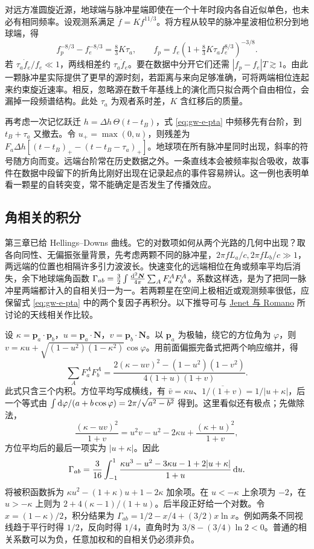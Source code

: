 对远方准圆旋近源，地球端与脉冲星端即使在一个十年时段内各自近似单色，也未必有相同频率。设观测系满足 $\dot f=K f^{11/3}$。将方程从较早的脉冲星波相位积分到地球端，得
\[
 f_p^{-8/3}-f_e^{-8/3}=\tfrac83K\tau_a,\qquad
 f_p=f_e\left(1+\tfrac83 K\tau_a f_e^{8/3}\right)^{-3/8}.
\]
若 $\tau_a\dot f_e/f_e\ll1$，两线相差约 $\tau_a\dot f_e$。要在数据中分开它们还需 $|f_p-f_e|T\gtrsim1$。由此一颗脉冲星实际提供了更早的源时刻，若距离与来向足够准确，可将两端相位连起来约束旋近速率。相反，忽略源在数千年基线上的演化而只拟合两个自由相位，会漏掉一段频谱结构。此处 $\tau_a$ 为观者系时差，$K$ 含红移后的质量。

再考虑一次记忆跃迁 $h=\Delta h\,\Theta(t-t_B)$，式 \eqref{eq:gw-e-pta} 中频移先有台阶，到 $t_B+\tau_a$ 又撤去。令 $u_+=\max(0,u)$，则残差为 $F_a\Delta h[(t-t_B)_+-(t-t_B-\tau_a)_+]$。地球项在所有脉冲星同时出现，斜率的符号随方向而变。远端台阶常在历史数据之外。一条直线本会被频率拟合吸收，故事件在数据中段留下的折角比刚好出现在记录起点的事件容易辨认。这一例也表明单看一颗星的自转突变，常不能确定是否发生了传播效应。

\subsection{角相关的积分}
第三章已给 Hellings--Downs 曲线。它的对数项如何从两个光路的几何中出现？取各向同性、无偏振张量背景，先考虑两颗不同的脉冲星，$2\pi fL_a/c,2\pi fL_b/c\gg1$，两远端的位置也相隔许多引力波波长。快速变化的远端相位在角或频率平均后消失，余下地球端角函数 $\Gamma_{ab}=\frac{3}{2}\int\frac{\dd^2\bm N}{4\pi}\sum_A F_a^A F_b^A$。系数这样选，是为了把同一脉冲星两端都计入的自相关归一为一。若两颗星在空间上极相近或观测频率很低，应保留式 \eqref{eq:gw-e-pta} 中的两个复因子再积分。以下推导可与 \href{https://arxiv.org/abs/1412.1142}{Jenet 与 Romano} 所讨论的天线相关作比较。

设 $\kappa=\bm p_a\cdot\bm p_b$，$u=\bm p_a\cdot\bm N$，$v=\bm p_b\cdot\bm N$。以 $\bm p_a$ 为极轴，绕它的方位角为 $\varphi$，则 $v=\kappa u+\sqrt{(1-u^2)(1-\kappa^2)}\cos\varphi$。用前面偏振完备式把两个响应缩并，得
\[
  \sum_A F_a^A F_b^A=
 \frac{2(\kappa-uv)^2-(1-u^2)(1-v^2)}{4(1+u)(1+v)} .
\]
此式只含三个内积。方位平均写成横线，有 $\bar v=\kappa u$、$\overline{1/(1+v)}=1/|u+\kappa|$，后一个等式由 $\int\dd\varphi/(a+b\cos\varphi)=2\pi/\sqrt{a^2-b^2}$ 得到。这里看似还有极点；先做除法，
\[
 \frac{(\kappa-uv)^2}{1+v}
 =u^2v-u^2-2\kappa u+\frac{(\kappa+u)^2}{1+v},
\]
方位平均后的最后一项实为 $|u+\kappa|$。因此
\[
 \Gamma_{ab}=\frac{3}{16}\int_{-1}^{1}
 \frac{\kappa u^3-u^2-3\kappa u-1+2|u+\kappa|}{1+u}\,\dd u .
\]
将被积函数拆为 $\kappa u^2-(1+\kappa)u+1-2\kappa$ 加余项。在 $u<-\kappa$ 上余项为 $-2$，在 $u>-\kappa$ 上则为 $2+4(\kappa-1)/(1+u)$。后半段正好给一个对数。令 $x=(1-\kappa)/2$，积分结果为 $\Gamma_{ab}=1/2-x/4+(3/2)x\ln x$。例如两条不同视线趋于平行时得 $1/2$，反向时得 $1/4$，直角时为 $3/8-(3/4)\ln2<0$。普通的相关系数可以为负，任意加权和的自相关仍必须非负。

